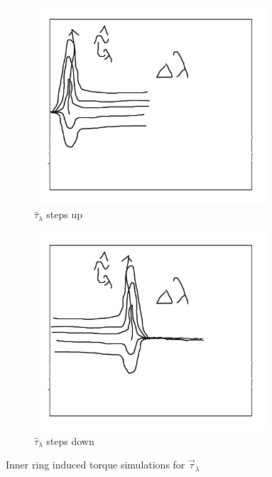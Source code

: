 \begin{figure}[hbtp]
\centering
\begin{subfigure}{0.49\textwidth}
\centering
\includegraphics[width=0.95\textwidth]{graphs/tau-lambda-hat-up}
\caption{$\hat{\tau}_\lambda$ steps up}
\label{fig:tau-lambda-hat-up}
\end{subfigure}
\begin{subfigure}{0.49\textwidth}
\includegraphics[width=0.95\textwidth]{graphs/tau-lambda-hat-down}
\caption{$\hat{\tau}_\lambda$ steps down}
\label{fig:tau-lambda-hat-down}
\end{subfigure}
\caption{Inner ring induced torque simulations for $\vec{\tau}_\lambda$}
\label{fig:tau-lambda-hat}
\end{figure}
